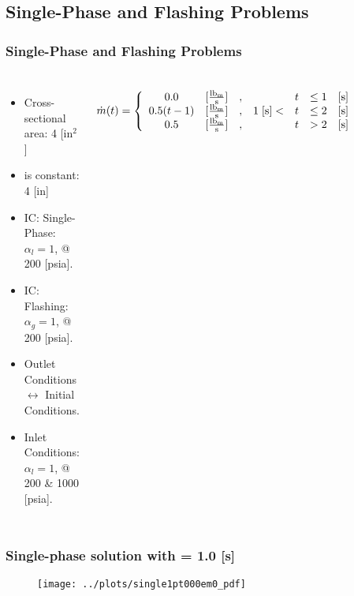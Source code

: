 \documentclass[compress,xcolor=table]{beamer}
\begin{document}
\subsection[Single-Phase and Flashing]{Single-Phase and Flashing Problems}
\begin{frame}
\frametitle{Single-Phase and Flashing Problems}
\begin{columns}

\begin{itemize}
\item{Cross-sectional area: 4 [in$^2$]}
\item{\dx{} is constant: 4 [in]}
\item{IC: Single-Phase: $\alpha_{l} = 1$, @ 200 [psia].}
\item{IC: Flashing: $\alpha_{g}=1$, @ 200 [psia].}
\item{Outlet Conditions $\longleftrightarrow$ Initial Conditions.}
\item{Inlet Conditions: $\alpha_{l}=1$, @ 200 \& 1000 [psia].}
\end{itemize}
\begin{equation*}
\dot{m}(t) = \left\{
\begin{array}{cclrcll}
 0.0           & [\frac{ \lbm{} }{\text{s}}] & , &                & t & \leq 1 & [\text{s}] \\
 0.5 ( t - 1)  & [\frac{ \lbm{} }{\text{s}}] & , & 1\; [\text{s}] < & t & \leq 2 & [\text{s}] \\
 0.5           & [\frac{ \lbm{} }{\text{s}}] & , &                & t & > 2    & [\text{s}]
\end{array}\right.
\end{equation*}

\begin{figure}[h!t]
\centering
\resizebox{\textwidth}{0.6\textheight}{

}

\end{figure}
\end{columns}
\end{frame}
\begin{frame}
\frametitle{Single-phase solution with \dtmax{} = 1.0 {[s]}}

\begin{figure}[h!t]
\centering
\texttt{[image: ../plots/single1pt000em0\_pdf]}
\end{figure}

\end{frame}
\end{document}
